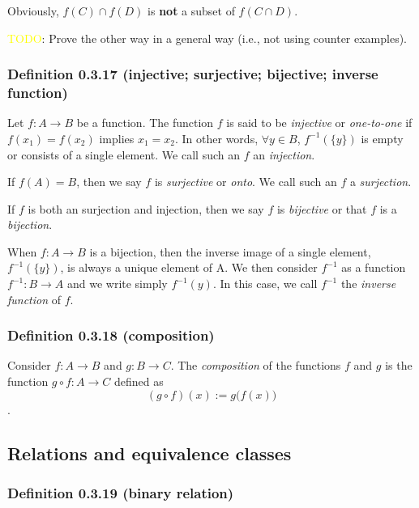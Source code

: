\documentclass[12pt, letterpaper, oneside]{book}
\begin{document}
Obviously, $f(C) \cap f(D)$ is \textbf{not} a subset of $f(C \cap D)$.

\colorbox{red!100}{\textcolor{yellow}{TODO}}: Prove the other way in a general
way (i.e., not using counter examples).

\subsubsection{Definition 0.3.17 (injective; surjective; bijective; inverse function)}

Let $f: A \rightarrow B$ be a function. The function $f$ is said to be
\textit{injective} or \textit{one-to-one} if $f(x_1) = f(x_2)$ implies $x_1 =
  x_2$. In other words, $\forall y \in B$, $f^{-1}(\{y\})$ is empty or consists
of a single element. We call such an $f$ an \textit{injection}.

If $f(A) = B$, then we say $f$ is \textit{surjective} or \textit{onto}. We call
such an $f$ a \textit{surjection}.

If $f$ is both an surjection and injection, then we say $f$ is
\textit{bijective} or that $f$ is a \textit{bijection}.

When $f: A \rightarrow B$ is a bijection, then the inverse image of a single
element, $f^{-1}(\{y\})$, is always a unique element of A. We then consider
$f^{-1}$ as a function $f^{-1}: B \rightarrow A$ and we write simply
$f^{-1}(y)$. In this case, we call $f^{-1}$ the \textit{inverse function} of
$f$.

\subsubsection{Definition 0.3.18 (composition)}

Consider $f: A \rightarrow B$ and $g: B \rightarrow C$. The \textit{composition}
of the functions $f$ and $g$ is the function $g \circ f: A \rightarrow C$
defined as \[(g \circ f)(x) := g \bigl(f(x)\bigr)\].

\subsection{Relations and equivalence classes}

\subsubsection{Definition 0.3.19 (binary relation)}
\end{document}
